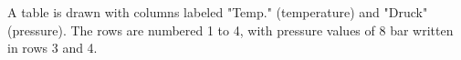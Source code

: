 A table is drawn with columns labeled "Temp." (temperature) and "Druck" (pressure). The rows are numbered 1 to 4, with pressure values of 8 bar written in rows 3 and 4.
